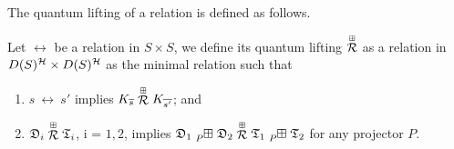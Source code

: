 The quantum lifting of a relation is defined as follows.
\begin{definition}
	Let $\rel$ be a relation in $S \times S$, we define its quantum lifting $\stackrel{\scriptscriptstyle \boxplus}{\mathcal{R}}$ as a relation in $D(S)^{\mathcal{H}} \times D(S)^{\mathcal{H}}$ as the minimal relation such that
	\begin{enumerate}
		\item $s\ \rel\ s'$ implies $K_{\overline{s}} \stackrel{\scriptscriptstyle \boxplus}{\mathcal{R}} K_{\overline{s'}}$; and
		\item $\mathfrak{D}_i \stackrel{\scriptscriptstyle \boxplus}{\mathcal{R}} \mathfrak{T}_i$, i = $1, 2$, implies $\quantumdst_1 \qsum{P} \quantumdst_2 \qlift{\rel} \quantumdsta_1 \qsum{P} \quantumdsta_2$ for any projector $P$.
	\end{enumerate}
\end{definition}

%

